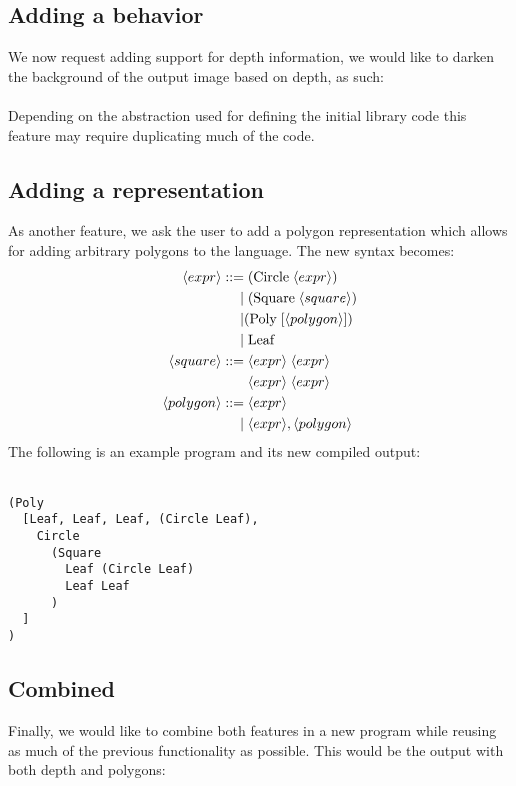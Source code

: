 \subsection{Adding a behavior}
We now request adding support for depth information, we would like to darken the background of the output image based on depth, as such:\\\\


Depending on the abstraction used for defining the initial library code this feature may require duplicating much of the code.

\subsection{Adding a representation}
As another feature, we ask the user to add a polygon representation which allows for adding arbitrary polygons to the language.
The new syntax becomes:
\begin{align*}
    \key{expr}  ::=& \; (\text{Circle}\;\key{expr}) \\
                |& \; (\text{Square}\;\key{square}) \\
                |& (\text{Poly}\;[\key{polygon}])\\
                |& \; \text{Leaf} \\
    \key{square} ::=&\; \vtop{\hbox{$\key{expr} \; \key{expr}$}\hbox{$\key{expr} \; \key{expr}$}}\\
    \key{polygon} ::=&\; \key{expr} \\
                  |&\; \key{expr}, \key{polygon}\\
\end{align*}
The following is an example program and its new compiled output:\\\\
\begin{minipage}[]{0.5\linewidth}
    \begin{verbatim}
(Poly
  [Leaf, Leaf, Leaf, (Circle Leaf),
    Circle
      (Square
        Leaf (Circle Leaf)
        Leaf Leaf
      )
  ]
)
    \end{verbatim}
\end{minipage}
\begin{minipage}[]{0.5\linewidth}
        
\end{minipage}

\subsection{Combined}
Finally, we would like to combine both features in a new program while reusing as much of the previous functionality as possible. This would be the output with both depth and polygons:\\\\


